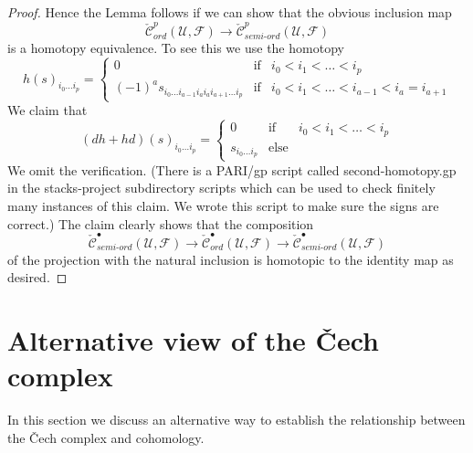 \begin{proof}
\medskip\noindent
Hence the Lemma follows if we can show that the obvious inclusion map
$$
\check{\mathcal{C}}_{ord}^p(\mathcal{U}, \mathcal{F})
\longrightarrow
\check{\mathcal{C}}_{semi\text{-}ord}^p(\mathcal{U}, \mathcal{F})
$$
is a homotopy equivalence. To see this we use the homotopy
\begin{equation}
\label{equation-second-homotopy}
h(s)_{i_0 \ldots i_p} =
\left\{
\begin{matrix}
0 & \text{if} & i_0 < i_1 < \ldots < i_p \\
(-1)^a s_{i_0 \ldots i_{a - 1} i_a i_a i_{a + 1} \ldots i_p}
& \text{if} & i_0 < i_1 < \ldots < i_{a - 1} < i_a = i_{a + 1}
\end{matrix}
\right.
\end{equation}
We claim that
$$
(dh + hd)(s)_{i_0 \ldots i_p} =
\left\{
\begin{matrix}
0 & \text{if} & i_0 < i_1 < \ldots < i_p \\
s_{i_0 \ldots i_p}
& \text{else} &
\end{matrix}
\right.
$$
We omit the verification. (There is a PARI/gp script called second-homotopy.gp
in the stacks-project subdirectory scripts which can be used to check
finitely many instances of this claim.
We wrote this script to make sure the signs are correct.)
The claim clearly shows that the composition
$$
\check{\mathcal{C}}_{semi\text{-}ord}^\bullet(\mathcal{U}, \mathcal{F})
\longrightarrow
\check{\mathcal{C}}_{ord}^\bullet(\mathcal{U}, \mathcal{F})
\longrightarrow
\check{\mathcal{C}}_{semi\text{-}ord}^\bullet(\mathcal{U}, \mathcal{F})
$$
of the projection with the natural inclusion
is homotopic to the identity map as desired.
\end{proof}





\section{Alternative view of the {\v C}ech complex}
\label{section-locally-finite-cech}

\noindent
In this section we discuss an alternative way to establish the relationship
between the {\v C}ech complex and cohomology.

